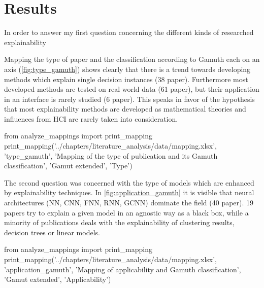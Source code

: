 \section{Results}

In order to answer my first question concerning the different kinds of researched explainability 

Mapping the type of paper and the classification according to Gamuth each on an axis (\autoref{fig:type_gamuth}) shows clearly that there is a trend towards developing methods which explain single decision instances (38 paper). Furthermore most developed methods are tested on real world data (61 paper), but their application in an interface is rarely studied (6 paper). This speaks in favor of the hypothesis that most explainability methods are developed as mathematical theories and influences from HCI are rarely taken into consideration.

\begin{pycode}
from analyze_mappings import print_mapping
print_mapping('../chapters/literature_analysis/data/mapping.xlsx', 'type_gamuth', 'Mapping of the type of publication and its Gamuth classification', 'Gamut extended', 'Type')
\end{pycode}

The second question was concerned with the type of models which are enhanced by explainability techniques. In \autoref{fig:application_gamuth} it is visible that neural architectures (NN, CNN, FNN, RNN, GCNN) dominate the field (40 paper). 19 papers try to explain a given model in an agnostic way as a black box, while a minority of publications deals with the explainability of clustering results, decision trees or linear models.

\begin{pycode}
from analyze_mappings import print_mapping
print_mapping('../chapters/literature_analysis/data/mapping.xlsx', 'application_gamuth', 'Mapping of applicability and Gamuth classification', 'Gamut extended', 'Applicability')
\end{pycode}

